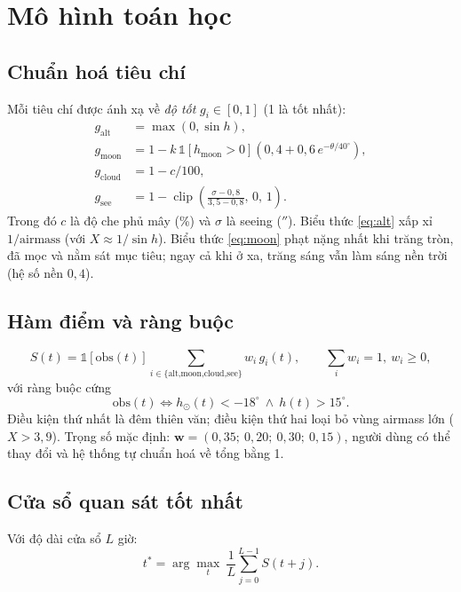 \documentclass[12pt,a4paper]{article}
\newcommand{\ind}{\mathbb{1}}
\newcommand{\arcsec}{\ensuremath{''}}
\begin{document}
\section{Mô hình toán học}

\subsection{Chuẩn hoá tiêu chí}
Mỗi tiêu chí được ánh xạ về \emph{độ tốt} $g_i\in[0,1]$ (1 là tốt nhất):
\begin{align}
g_{\text{alt}}  &= \max(0,\sin h), \label{eq:alt}\\
g_{\text{moon}} &= 1 - k\,\ind[h_{\text{moon}}>0]\left(0{,}4 + 0{,}6\,e^{-\theta/40^\circ}\right), \label{eq:moon}\\
g_{\text{cloud}} &= 1 - c/100, \label{eq:cloud}\\
g_{\text{see}}  &= 1 - \operatorname{clip}\!\left(\frac{\sigma-0{,}8}{3{,}5-0{,}8},\,0,\,1\right). \label{eq:see}
\end{align}
Trong đó $c$ là độ che phủ mây (\%) và $\sigma$ là seeing (\arcsec).
Biểu thức \eqref{eq:alt} xấp xỉ $1/\text{airmass}$ (với $X\approx 1/\sin h$).
Biểu thức \eqref{eq:moon} phạt nặng nhất khi trăng tròn, đã mọc và nằm sát mục tiêu; ngay cả khi
ở xa, trăng sáng vẫn làm sáng nền trời (hệ số nền $0{,}4$).

\subsection{Hàm điểm và ràng buộc}
\begin{equation}
S(t) = \ind[\text{obs}(t)]\sum_{i\in\{\text{alt,moon,cloud,see}\}} w_i\,g_i(t),
\qquad \sum_i w_i = 1,\ w_i\ge 0,
\end{equation}
với ràng buộc cứng
\begin{equation}
\text{obs}(t) \iff h_\odot(t) < -18^\circ \ \wedge\ h(t) > 15^\circ .
\end{equation}
Điều kiện thứ nhất là đêm thiên văn; điều kiện thứ hai loại bỏ vùng airmass lớn ($X>3{,}9$).
Trọng số mặc định: $\bm{w} = (0{,}35;\ 0{,}20;\ 0{,}30;\ 0{,}15)$, người dùng có thể thay đổi
và hệ thống tự chuẩn hoá về tổng bằng 1.

\subsection{Cửa sổ quan sát tốt nhất}
Với độ dài cửa sổ $L$ giờ:
\begin{equation}
t^\ast = \arg\max_{t}\ \frac{1}{L}\sum_{j=0}^{L-1} S(t+j).
\end{equation}
\end{document}

